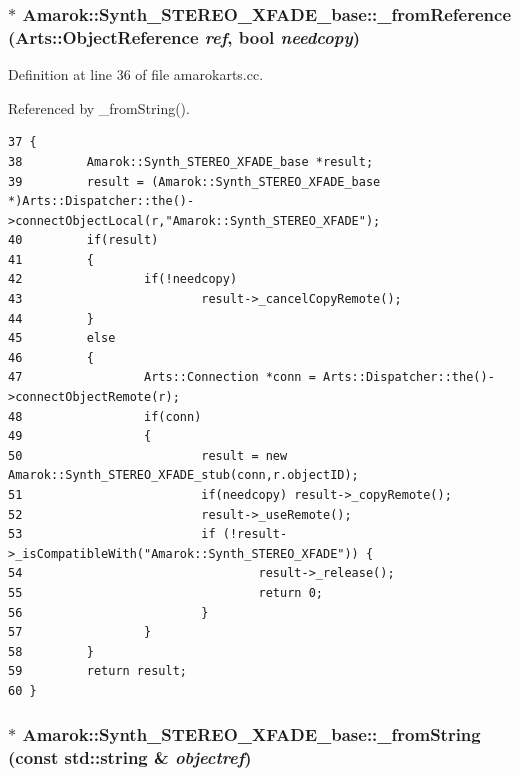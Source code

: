 \subsubsection{ $\ast$ Amarok::Synth\_\-STEREO\_\-XFADE\_\-base::\_\-from\-Reference (Arts::Object\-Reference {\em ref}, bool {\em needcopy})\hspace{0.3cm}{\tt  [static]}}\label{classAmarok_1_1Synth__STEREO__XFADE__base_Amarok_1_1Synth__STEREO__XFADE__stube2}




Definition at line 36 of file amarokarts.cc.

Referenced by \_\-from\-String().



\footnotesize\begin{verbatim}37 {
38         Amarok::Synth_STEREO_XFADE_base *result;
39         result = (Amarok::Synth_STEREO_XFADE_base *)Arts::Dispatcher::the()->connectObjectLocal(r,"Amarok::Synth_STEREO_XFADE");
40         if(result)
41         {
42                 if(!needcopy)
43                         result->_cancelCopyRemote();
44         }
45         else
46         {
47                 Arts::Connection *conn = Arts::Dispatcher::the()->connectObjectRemote(r);
48                 if(conn)
49                 {
50                         result = new Amarok::Synth_STEREO_XFADE_stub(conn,r.objectID);
51                         if(needcopy) result->_copyRemote();
52                         result->_useRemote();
53                         if (!result->_isCompatibleWith("Amarok::Synth_STEREO_XFADE")) {
54                                 result->_release();
55                                 return 0;
56                         }
57                 }
58         }
59         return result;
60 }
\end{verbatim}\normalsize 
{}
\subsubsection{ $\ast$ Amarok::Synth\_\-STEREO\_\-XFADE\_\-base::\_\-from\-String (const std::string \& {\em objectref})\hspace{0.3cm}{\tt  [static]}}\label{classAmarok_1_1Synth__STEREO__XFADE__base_Amarok_1_1Synth__STEREO__XFADE__stube1}




